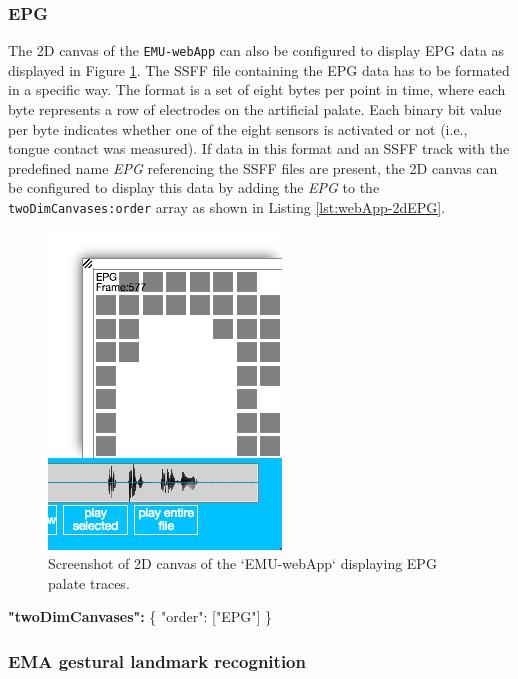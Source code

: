 \documentclass[]{book}
\newenvironment{Shaded}{\begin{snugshade}}{\end{snugshade}}
\newcommand{\DataTypeTok}[1]{\textcolor[rgb]{0.13,0.29,0.53}{#1}}
\newcommand{\ErrorTok}[1]{\textcolor[rgb]{0.64,0.00,0.00}{\textbf{#1}}}
\newcommand{\FunctionTok}[1]{\textcolor[rgb]{0.00,0.00,0.00}{#1}}
\newcommand{\OtherTok}[1]{\textcolor[rgb]{0.56,0.35,0.01}{#1}}
\newcommand{\StringTok}[1]{\textcolor[rgb]{0.31,0.60,0.02}{#1}}
\theoremstyle{definition}
\theoremstyle{definition}
\theoremstyle{definition}
\theoremstyle{remark}
\begin{document}
\hypertarget{epg}{%
\subsubsection{EPG}\label{epg}}

The 2D canvas of the \texttt{EMU-webApp} can also be configured to
display EPG data as displayed in Figure \ref{fig:webApp-2dEPG}. The SSFF
file containing the EPG data has to be formated in a specific way. The
format is a set of eight bytes per point in time, where each byte
represents a row of electrodes on the artificial palate. Each binary bit
value per byte indicates whether one of the eight sensors is activated
or not (i.e., tongue contact was measured). If data in this format and
an SSFF track with the predefined name \emph{EPG} referencing the SSFF
files are present, the 2D canvas can be configured to display this data
by adding the \emph{EPG} to the \texttt{twoDimCanvases:order} array as
shown in Listing \ref{lst:webApp-2dEPG}.

\begin{figure}

{\centering \includegraphics[width=0.35\linewidth]{pics/emu-webApp2dEPG} 

}

\caption{Screenshot of 2D canvas of the `EMU-webApp` displaying EPG palate traces.}\label{fig:webApp-2dEPG}
\end{figure}

\begin{Shaded}
\begin{Highlighting}[]
\ErrorTok{"twoDimCanvases":} \FunctionTok{\{}
    \DataTypeTok{"order"}\FunctionTok{:} \OtherTok{[}\StringTok{"EPG"}\OtherTok{]}
\FunctionTok{\}}
\end{Highlighting}
\end{Shaded}

\hypertarget{ema-gestural-landmark-recognition}{%
\subsubsection{EMA gestural landmark
recognition}\label{ema-gestural-landmark-recognition}}
\end{document}
